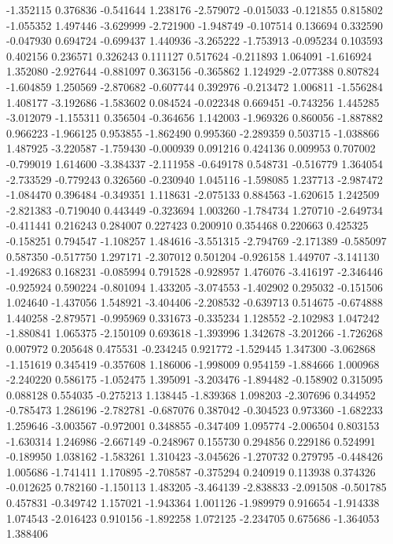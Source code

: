 -1.352115
0.376836
-0.541644
1.238176
-2.579072
-0.015033
-0.121855
0.815802
-1.055352
1.497446
-3.629999
-2.721900
-1.948749
-0.107514
0.136694
0.332590
-0.047930
0.694724
-0.699437
1.440936
-3.265222
-1.753913
-0.095234
0.103593
0.402156
0.236571
0.326243
0.111127
0.517624
-0.211893
1.064091
-1.616924
1.352080
-2.927644
-0.881097
0.363156
-0.365862
1.124929
-2.077388
0.807824
-1.604859
1.250569
-2.870682
-0.607744
0.392976
-0.213472
1.006811
-1.556284
1.408177
-3.192686
-1.583602
0.084524
-0.022348
0.669451
-0.743256
1.445285
-3.012079
-1.155311
0.356504
-0.364656
1.142003
-1.969326
0.860056
-1.887882
0.966223
-1.966125
0.953855
-1.862490
0.995360
-2.289359
0.503715
-1.038866
1.487925
-3.220587
-1.759430
-0.000939
0.091216
0.424136
0.009953
0.707002
-0.799019
1.614600
-3.384337
-2.111958
-0.649178
0.548731
-0.516779
1.364054
-2.733529
-0.779243
0.326560
-0.230940
1.045116
-1.598085
1.237713
-2.987472
-1.084470
0.396484
-0.349351
1.118631
-2.075133
0.884563
-1.620615
1.242509
-2.821383
-0.719040
0.443449
-0.323694
1.003260
-1.784734
1.270710
-2.649734
-0.411441
0.216243
0.284007
0.227423
0.200910
0.354468
0.220663
0.425325
-0.158251
0.794547
-1.108257
1.484616
-3.551315
-2.794769
-2.171389
-0.585097
0.587350
-0.517750
1.297171
-2.307012
0.501204
-0.926158
1.449707
-3.141130
-1.492683
0.168231
-0.085994
0.791528
-0.928957
1.476076
-3.416197
-2.346446
-0.925924
0.590224
-0.801094
1.433205
-3.074553
-1.402902
0.295032
-0.151506
1.024640
-1.437056
1.548921
-3.404406
-2.208532
-0.639713
0.514675
-0.674888
1.440258
-2.879571
-0.995969
0.331673
-0.335234
1.128552
-2.102983
1.047242
-1.880841
1.065375
-2.150109
0.693618
-1.393996
1.342678
-3.201266
-1.726268
0.007972
0.205648
0.475531
-0.234245
0.921772
-1.529445
1.347300
-3.062868
-1.151619
0.345419
-0.357608
1.186006
-1.998009
0.954159
-1.884666
1.000968
-2.240220
0.586175
-1.052475
1.395091
-3.203476
-1.894482
-0.158902
0.315095
0.088128
0.554035
-0.275213
1.138445
-1.839368
1.098203
-2.307696
0.344952
-0.785473
1.286196
-2.782781
-0.687076
0.387042
-0.304523
0.973360
-1.682233
1.259646
-3.003567
-0.972001
0.348855
-0.347409
1.095774
-2.006504
0.803153
-1.630314
1.246986
-2.667149
-0.248967
0.155730
0.294856
0.229186
0.524991
-0.189950
1.038162
-1.583261
1.310423
-3.045626
-1.270732
0.279795
-0.448426
1.005686
-1.741411
1.170895
-2.708587
-0.375294
0.240919
0.113938
0.374326
-0.012625
0.782160
-1.150113
1.483205
-3.464139
-2.838833
-2.091508
-0.501785
0.457831
-0.349742
1.157021
-1.943364
1.001126
-1.989979
0.916654
-1.914338
1.074543
-2.016423
0.910156
-1.892258
1.072125
-2.234705
0.675686
-1.364053
1.388406
